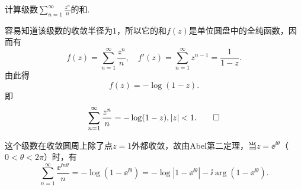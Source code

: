 \begin{example}\label{exam4.2.10}
  计算级数$\sum_{n=1}^\infty\frac{z^n}n$的和.
\end{example}
\begin{solution}
  容易知道该级数的收敛半径为$1$，所以它的和$f(z)$是单位圆盘中的全纯函数，因而有
  \[
    f(z) = \sum_{n=1}^\infty\frac{z^n}n, \quad f'(z) = \sum_{n=1}^\infty z^{n-1} = \frac1{1-z}.
  \]
  由此得
  \[
    f(z) = -\log(1-z).
  \]
  即
  \begin{equation*}
    \sum_{n=1}^\infty\frac{z^n}n = -\log(1-z), |z|<1. \qedhere
  \end{equation*}
\end{solution}

这个级数在收敛圆周上除了点$z=1$外都收敛，故由Abel第二定理，当$z=\ee^{\ii\theta}$（$0<\theta<2\pi$）时，有
\begin{equation}\label{eq4.2.5}
  \sum_{n=1}^\infty\frac{\ee^{\ii n\theta}}n = - \log(1-\ee^{\ii\theta})
  = -\log|1-\ee^{\ii\theta}| - \ii\arg(1-\ee^{\ii\theta}).
\end{equation}

